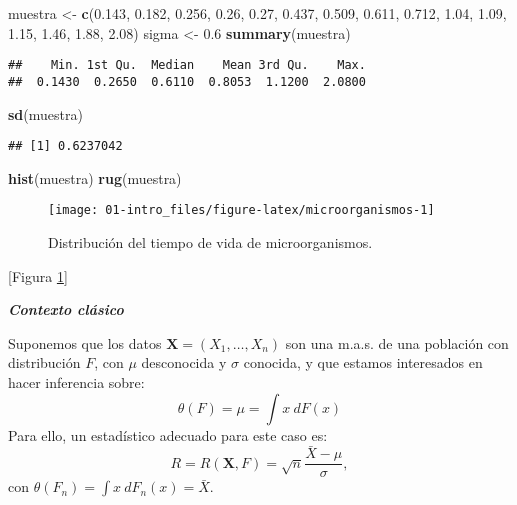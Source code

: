 \documentclass[
]{book}
\newenvironment{Shaded}{\begin{snugshade}}{\end{snugshade}}
\newcommand{\FloatTok}[1]{\textcolor[rgb]{0.00,0.00,0.81}{#1}}
\newcommand{\KeywordTok}[1]{\textcolor[rgb]{0.13,0.29,0.53}{\textbf{#1}}}
\newcommand{\NormalTok}[1]{#1}
\newcommand{\StringTok}[1]{\textcolor[rgb]{0.31,0.60,0.02}{#1}}
\theoremstyle{break}
\theoremstyle{definition}
\theoremstyle{definition}
\theoremstyle{definition}
\theoremstyle{remark}
\begin{document}
\begin{Shaded}
\begin{Highlighting}[]
\NormalTok{muestra <-}\StringTok{ }\KeywordTok{c}\NormalTok{(}\FloatTok{0.143}\NormalTok{, }\FloatTok{0.182}\NormalTok{, }\FloatTok{0.256}\NormalTok{, }\FloatTok{0.26}\NormalTok{, }\FloatTok{0.27}\NormalTok{, }\FloatTok{0.437}\NormalTok{, }\FloatTok{0.509}\NormalTok{, }
    \FloatTok{0.611}\NormalTok{, }\FloatTok{0.712}\NormalTok{, }\FloatTok{1.04}\NormalTok{, }\FloatTok{1.09}\NormalTok{, }\FloatTok{1.15}\NormalTok{, }\FloatTok{1.46}\NormalTok{, }\FloatTok{1.88}\NormalTok{, }\FloatTok{2.08}\NormalTok{)}
\NormalTok{sigma <-}\StringTok{ }\FloatTok{0.6}
\KeywordTok{summary}\NormalTok{(muestra)}
\end{Highlighting}
\end{Shaded}

\begin{verbatim}
##    Min. 1st Qu.  Median    Mean 3rd Qu.    Max. 
##  0.1430  0.2650  0.6110  0.8053  1.1200  2.0800
\end{verbatim}

\begin{Shaded}
\begin{Highlighting}[]
\KeywordTok{sd}\NormalTok{(muestra)}
\end{Highlighting}
\end{Shaded}

\begin{verbatim}
## [1] 0.6237042
\end{verbatim}

\begin{Shaded}
\begin{Highlighting}[]
\KeywordTok{hist}\NormalTok{(muestra)}
\KeywordTok{rug}\NormalTok{(muestra)}
\end{Highlighting}
\end{Shaded}

\begin{figure}[!htb]

{\centering \texttt{[image: 01-intro\_files/figure-latex/microorganismos-1]} 

}

\caption{Distribución del tiempo de vida de microorganismos.}\label{fig:microorganismos}
\end{figure}

{[}Figura \ref{fig:microorganismos}{]}

\textbf{\emph{Contexto clásico}}

Suponemos que los datos \(\mathbf{X}=\left( X_1,\ldots ,X_n \right)\) son una m.a.s.
de una población con distribución \(F\), con \(\mu\) desconocida y \(\sigma\) conocida,
y que estamos interesados en hacer inferencia sobre:
\[\theta \left( F \right) =\mu =\int x~dF\left( x \right)\]
Para ello, un estadístico adecuado para este caso es:
\[R=R\left( \mathbf{X},F \right) =\sqrt{n}\frac{\bar{X}-\mu }{\sigma},\]
con \(\theta \left( F_n \right) =\int x~dF_n\left( x \right) = \bar{X}\).
\end{document}
